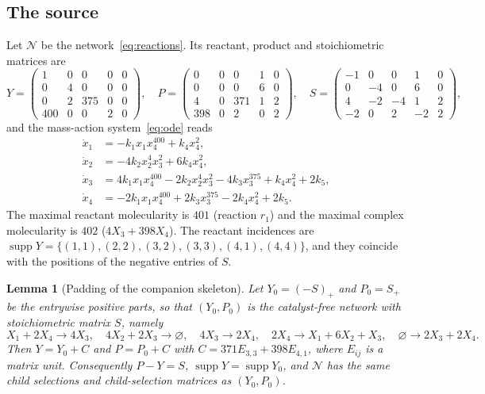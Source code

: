 \documentclass[11pt,a4paper]{article}
\theoremstyle{plain}
\newtheorem{lemma}[theorem]{Lemma}
\theoremstyle{definition}
\theoremstyle{remark}
\newcommand{\supp}{\operatorname{supp}}
\newcommand{\Osc}{\mathcal{N}}
\begin{document}
\subsection{The source}\label{sec:source}

Let $\Osc$ be the network~\eqref{eq:reactions}. Its reactant, product and stoichiometric matrices are
\begingroup\setlength{\arraycolsep}{3.5pt}
\begin{equation}\label{eq:matrices}
Y=\begin{pmatrix}1&0&0&0&0\\0&4&0&0&0\\0&2&375&0&0\\400&0&0&2&0\end{pmatrix},\quad
P=\begin{pmatrix}0&0&0&1&0\\0&0&0&6&0\\4&0&371&1&2\\398&0&2&0&2\end{pmatrix},\quad
S=\begin{pmatrix}-1&0&0&1&0\\0&-4&0&6&0\\4&-2&-4&1&2\\-2&0&2&-2&2\end{pmatrix},
\end{equation}
\endgroup
and the mass-action system~\eqref{eq:ode} reads
\begin{equation}\label{eq:system}
\begin{aligned}
\dot x_1&=-k_1x_1x_4^{400}+k_4x_4^2,\\
\dot x_2&=-4k_2x_2^4x_3^2+6k_4x_4^2,\\
\dot x_3&=4k_1x_1x_4^{400}-2k_2x_2^4x_3^2-4k_3x_3^{375}+k_4x_4^2+2k_5,\\
\dot x_4&=-2k_1x_1x_4^{400}+2k_3x_3^{375}-2k_4x_4^2+2k_5 .
\end{aligned}
\end{equation}
The maximal reactant molecularity is $401$ (reaction $r_1$) and the maximal complex molecularity is $402$ ($4X_3+398X_4$). The reactant incidences are $\supp Y=\{(1,1),(2,2),(3,2),(3,3),(4,1),(4,4)\}$, and they coincide with the positions of the negative entries of $S$.

\begin{lemma}[Padding of the companion skeleton]\label{lem:padding}
Let $Y_0=(-S)_+$ and $P_0=S_+$ be the entrywise positive parts, so that $(Y_0,P_0)$ is the catalyst-free network with stoichiometric matrix $S$, namely
\[
X_1+2X_4\to4X_3,\quad 4X_2+2X_3\to\varnothing,\quad 4X_3\to2X_4,\quad 2X_4\to X_1+6X_2+X_3,\quad \varnothing\to2X_3+2X_4 .
\]
Then $Y=Y_0+C$ and $P=P_0+C$ with $C=371E_{3,3}+398E_{4,1}$, where $E_{ij}$ is a matrix unit. Consequently $P-Y=S$, $\supp Y=\supp Y_0$, and $\Osc$ has the same child selections and child-selection matrices as $(Y_0,P_0)$.
\end{lemma}
\end{document}
